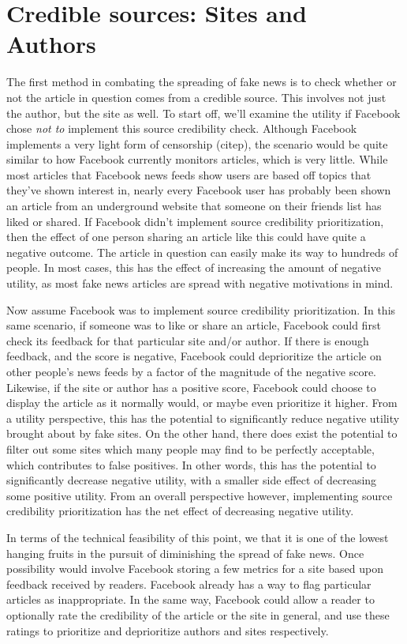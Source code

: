 \documentclass[12pt]{article}
\begin{document}
\section{Credible sources: Sites and Authors}
The first method in combating the spreading of fake news is to check whether or not the article in question comes from a credible source. This involves not just the author, but the site as well. To start off, we'll examine the utility if Facebook chose \textit{not to} implement this source credibility check. Although Facebook implements a very light form of censorship (citep), the scenario would be quite similar to how Facebook currently monitors articles, which is very little. While most articles that Facebook news feeds show users are based off topics that they've shown interest in, nearly every Facebook user has probably been shown an article from an underground website that someone on their friends list has liked or shared. If Facebook didn't implement source credibility prioritization, then the effect of one person sharing an article like this could have quite a negative outcome. The article in question can easily make its way to hundreds of people. In most cases, this has the effect of increasing the amount of negative utility, as most fake news articles are spread with negative motivations in mind.

Now assume Facebook was to implement source credibility prioritization. In this same scenario, if someone was to like or share an article, Facebook could first check its feedback for that particular site and/or author. If there is enough feedback, and the score is negative, Facebook could deprioritize the article on other people's news feeds by a factor of the magnitude of the negative score. Likewise, if the site or author has a positive score, Facebook could choose to display the article as it normally would, or maybe even prioritize it higher. From a utility perspective, this has the potential to significantly reduce negative utility brought about by fake sites. On the other hand, there does exist the potential to filter out some sites which many people may find to be perfectly acceptable, which contributes to false positives. In other words, this has the potential to significantly decrease negative utility, with a smaller side effect of decreasing some positive utility. From an overall perspective however, implementing source credibility prioritization has the net effect of decreasing negative utility.

In terms of the technical feasibility of this point, we that it is one of the lowest hanging fruits in the pursuit of diminishing the spread of fake news. Once possibility would involve Facebook storing a few metrics for a site based upon feedback received by readers. Facebook already has a way to flag particular articles as inappropriate. In the same way, Facebook could allow a reader to optionally rate the credibility of the article or the site in general, and use these ratings to prioritize and deprioritize authors and sites respectively. 
\end{document}
